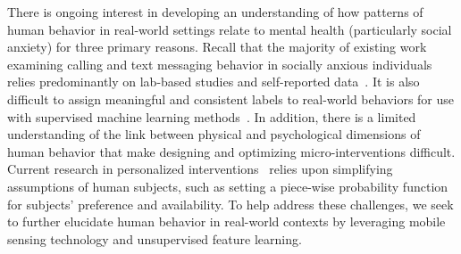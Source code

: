 % 
% 
% 

There is ongoing interest in developing an understanding of how patterns of human behavior in real-world settings relate to mental health (particularly social anxiety) for three primary reasons.   Recall that the majority of existing work examining calling and text messaging behavior in socially anxious individuals relies predominantly on lab-based studies and self-reported data~\cite{reid2007text}. It is also difficult to assign meaningful and consistent labels to real-world behaviors for use with supervised machine learning methods~\cite{hoque2014vocal, mondol2016lifemaps}. %
In addition, there is a limited understanding of the link between physical and psychological dimensions of human behavior that make designing and optimizing micro-interventions difficult. Current research in personalized interventions~\cite{bekiroglu2016control, klasnja2015microrandomized} relies upon simplifying assumptions of human subjects, such as setting a piece-wise probability function for subjects' preference and availability. %
To help address these challenges, we seek to further elucidate human behavior in real-world contexts by leveraging mobile sensing technology and unsupervised feature learning. 

